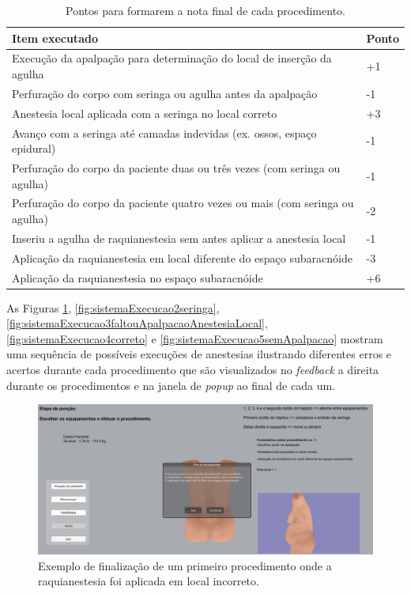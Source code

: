 \begin{table}[!ht]
\begin{center}
\caption{Pontos para formarem a nota final de cada procedimento.}
\label{tab:PontosNotaProcedimento}
\begin{tabular}{|p{0.9\linewidth}|p{0.1\linewidth}|}
\hline
\textbf{Item executado} & \textbf{Ponto}\\
\hline\hline
Execução da apalpação para determinação do local de inserção da agulha & +1\\
Perfuração do corpo com seringa ou agulha antes da apalpação & -1\\
Anestesia local aplicada com a seringa no local correto & +3\\
Avanço com a seringa até camadas indevidas (ex. ossos, espaço epidural) & -1\\
Perfuração do corpo da paciente duas ou três vezes (com seringa ou agulha) & -1\\
Perfuração do corpo da paciente quatro vezes ou mais (com seringa ou agulha) & -2\\
Inseriu a agulha de raquianestesia sem antes aplicar a anestesia local & -1\\
Aplicação da raquianestesia em local diferente do espaço subaracnóide & -3\\
Aplicação da raquianestesia no espaço subaracnóide & +6\\
\end{tabular}
\end{center}
\end{table}

As Figuras \ref{fig:sistemaExecucao1RaquiLocalIncorreto}, \ref{fig:sistemaExecucao2seringa}, \ref{fig:sistemaExecucao3faltouApalpacaoAnestesiaLocal}, \ref{fig:sistemaExecucao4correto} e \ref{fig:sistemaExecucao5semApalpacao} mostram uma sequência de possíveis execuções de anestesias ilustrando diferentes erros e acertos durante cada procedimento que são visualizados no \textit{feedback} a direita durante os procedimentos e na janela de \textit{popup} ao final de cada um.  

\begin{figure}[ht!]
    \centering
    \includegraphics[width=\textwidth]{capitulos/figuras/sistema-exemplo-execucao-procedimento-1.png} 
    \caption{Exemplo de finalização de um primeiro procedimento onde a raquianestesia foi aplicada em local incorreto.}
    \label{fig:sistemaExecucao1RaquiLocalIncorreto}
\end{figure}

